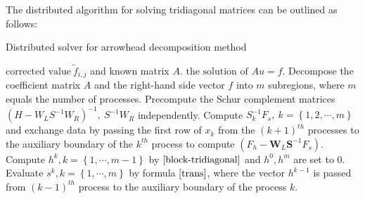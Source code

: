 

The distributed algorithm for solving tridiagonal matrices can be outlined as follows:
\begin{algorithm}[H]
\renewcommand{\algorithmicrequire}{\textbf{Input:}}
\renewcommand{\algorithmicensure}{\textbf{Output:}}
\caption{Distributed solver for arrowhead decomposition method}
\begin{algorithmic}[1]
\Require $\text{corrected value} ~\tilde{f}_{i,j}$ and known matrix $A$.
\Ensure $\text{the solution of}$ $Au = f$.
\State Decompose the coefficient matrix $A$ and the right-hand side vector $f$ into $m$ subregions, where $m$ equals the number of processes.
\State Precompute the Schur complement matrices $(H-W_LS^{-1}W_R)^{-1}, ~S^{-1}W_R$ independently. 
\State Compute $S_{k}^{-1}F_{s}, ~k = \left\{1,2, \cdots, m\right\}$ and exchange data by passing the first row of $x_k$ from the $(k+1)^{th}$ processes to the auxiliary boundary of the $k^{th}$ process to compute $\left(F_h-\mathbf{W}_L \mathbf{S}^{-1} F_s\right)$.
\State Compute $h^{k}, k = \left\{1, \cdots, m-1\right\}$ by $\eqref{block-tridiagonal}$ and $h^{0}, h^{m}$ are set to 0.
\State Evaluate $s^{k}, k = \left\{1, \cdots, m\right\}$ by formula $\eqref{trans}$, where the vector $h^{k-1}$ is passed from $(k-1)^{th}$ process  to the auxiliary boundary of the process $k$.
\end{algorithmic}
\end{algorithm}
 
